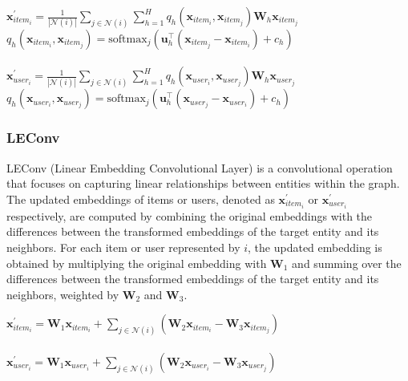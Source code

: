 \documentclass{scrartcl}
\begin{document}
\begin{center}
    $\mathbf{x}^{\prime}_{item_{i}} = \frac{1}{|\mathcal{N}(i)|} \sum_{j \in \mathcal{N}(i)} \sum_{h=1}^H
    q_h(\mathbf{x}_{item_{i}}, \mathbf{x}_{item_{j}}) \mathbf{W}_h \mathbf{x}_{item_{j}}$ \\
    $q_h(\mathbf{x}_{item_{i}}, \mathbf{x}_{item_{j}}) = \mathrm{softmax}_{j}
    (\mathbf{u}_h^{\top} (\mathbf{x}_{item_{j}} - \mathbf{x}_{item_{i}}) + c_h)$
    \\~\\
    $\mathbf{x}^{\prime}_{user_{i}} = \frac{1}{|\mathcal{N}(i)|} \sum_{j \in \mathcal{N}(i)} \sum_{h=1}^H
    q_h(\mathbf{x}_{user_{i}}, \mathbf{x}_{user_{j}}) \mathbf{W}_h \mathbf{x}_{user_{j}}$ \\ 
     $q_h(\mathbf{x}_{user_{i}}, \mathbf{x}_{user_{j}}) = \mathrm{softmax}_j
    (\mathbf{u}_h^{\top} (\mathbf{x}_{user_{j}} - \mathbf{x}_{user_{i}}) + c_h)$
\end{center}


\subsubsection{LEConv\cite{leconv}} 

\quad LEConv (Linear Embedding Convolutional Layer) is a convolutional operation that focuses on capturing linear relationships between entities within the graph. The updated embeddings of items or users, denoted as $\mathbf{x}^{\prime}_{item_i}$ or $\mathbf{x}^{\prime}_{user_i}$ respectively, are computed by combining the original embeddings with the differences between the transformed embeddings of the target entity and its neighbors. For each item or user represented by $i$, the updated embedding is obtained by multiplying the original embedding with $\mathbf{W}_1$ and summing over the differences between the transformed embeddings of the target entity and its neighbors, weighted by $\mathbf{W}_2$ and $\mathbf{W}_3$. \\ 

\begin{center}
    $\mathbf{x}^{\prime}_{item_{i}} = \mathbf{W}_1 \mathbf{x}_{item_{i}} +
    \sum_{j \in \mathcal{N}(i)}
    (\mathbf{W}_2 \mathbf{x}_{item_{i}} - \mathbf{W}_3 \mathbf{x}_{item_{j}})$ \\~\\
    $\mathbf{x}^{\prime}_{user_{i}} = \mathbf{W}_1 \mathbf{x}_{user_{i}} +
    \sum_{j \in \mathcal{N}(i)}
    (\mathbf{W}_2 \mathbf{x}_{user_{i}} - \mathbf{W}_3 \mathbf{x}_{user_{j}})$
\end{center}
\end{document}
